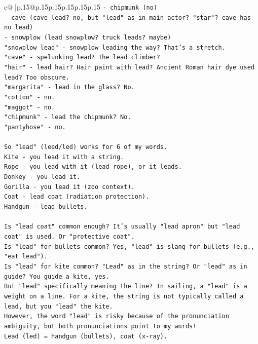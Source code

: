 \documentclass{article}
\begin{document}
{\begin{supertabular}{c@{$\;$}|p{.15\linewidth}@{}p{.15\linewidth}p{.15\linewidth}p{.15\linewidth}p{.15\linewidth}p{.15\linewidth}}
{{{\texttt{{-} chipmunk (no)} \\
\texttt{{-} cave (cave lead? no, but "lead" as in main actor? "star"? cave has no lead)} \\
\texttt{{-} snowplow (lead snowplow? truck leads? maybe)} \\
\texttt{"snowplow lead" {-} snowplow leading the way? That's a stretch.} \\
\texttt{"cave" {-} spelunking lead? The lead climber?} \\
\texttt{"hair" {-} lead hair? Hair paint with lead? Ancient Roman hair dye used lead? Too obscure.} \\
\texttt{"margarita" {-} lead in the glass? No.} \\
\texttt{"cotton" {-} no.} \\
\texttt{"maggot" {-} no.} \\
\texttt{"chipmunk" {-} lead the chipmunk? No.} \\
\texttt{"pantyhose" {-} no.} \\
\\ 
\texttt{So "lead" (leed/led) works for 6 of my words.} \\
\texttt{Kite {-} you lead it with a string.} \\
\texttt{Rope {-} you lead with it (lead rope), or it leads.} \\
\texttt{Donkey {-} you lead it.} \\
\texttt{Gorilla {-} you lead it (zoo context).} \\
\texttt{Coat {-} lead coat (radiation protection).} \\
\texttt{Handgun {-} lead bullets.} \\
\\ 
\texttt{Is "lead coat" common enough? It's usually "lead apron" but "lead coat" is used. Or "protective coat".} \\
\texttt{Is "lead" for bullets common? Yes, "lead" is slang for bullets (e.g., "eat lead").} \\
\texttt{Is "lead" for kite common? "Lead" as in the string? Or "lead" as in guide? You guide a kite, yes.} \\
\texttt{But "lead" specifically meaning the line? In sailing, a "lead" is a weight on a line. For a kite, the string is not typically called a lead, but you "lead" the kite.} \\
\texttt{However, the word "lead" is risky because of the pronunciation ambiguity, but both pronunciations point to my words!} \\
\texttt{Lead (led) = handgun (bullets), coat (x{-}ray).} \\
}}}
\end{supertabular}}
\end{document}
